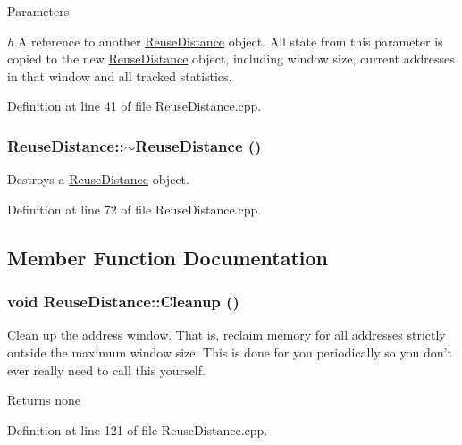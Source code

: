 \begin{DoxyParams}{Parameters}
\item[{\em h}]A reference to another \hyperlink{class_reuse_distance}{ReuseDistance} object. All state from this parameter is copied to the new \hyperlink{class_reuse_distance}{ReuseDistance} object, including window size, current addresses in that window and all tracked statistics. \end{DoxyParams}


Definition at line 41 of file ReuseDistance.cpp.

\hypertarget{class_reuse_distance_a2846a6f2c045759657b754838045900d}{
\subsubsection[{$\sim$ReuseDistance}]{\setlength{\rightskip}{0pt plus 5cm}ReuseDistance::$\sim$ReuseDistance ()}}
\label{class_reuse_distance_a2846a6f2c045759657b754838045900d}
Destroys a \hyperlink{class_reuse_distance}{ReuseDistance} object. 

Definition at line 72 of file ReuseDistance.cpp.



\subsection{Member Function Documentation}
\hypertarget{class_reuse_distance_a6f56cdb0f1e6958173398e134556a5ab}{
\subsubsection[{Cleanup}]{\setlength{\rightskip}{0pt plus 5cm}void ReuseDistance::Cleanup ()}}
\label{class_reuse_distance_a6f56cdb0f1e6958173398e134556a5ab}
Clean up the address window. That is, reclaim memory for all addresses strictly outside the maximum window size. This is done for you periodically so you don't ever really need to call this yourself.

\begin{DoxyReturn}{Returns}
none 
\end{DoxyReturn}


Definition at line 121 of file ReuseDistance.cpp.

